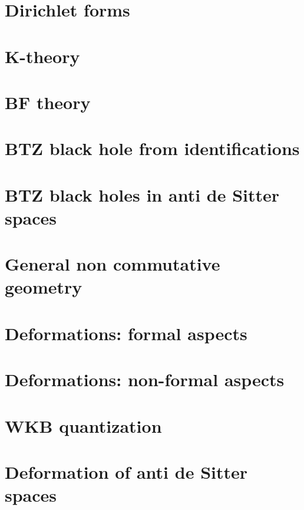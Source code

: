 \documentclass[a4paper,twoside,11pt]{book}
\begin{document}
\chapter{Dirichlet forms}


\chapter{K-theory}


\chapter{BF theory}


\chapter{BTZ black hole from identifications}




\chapter{BTZ black holes in anti de Sitter spaces}                  \label{ChapBHinAdS}









\chapter{General non commutative geometry}




\chapter{Deformations: formal aspects}          \label{ChapDefo}


\chapter{Deformations: non-formal aspects}




\chapter{WKB quantization}


\chapter{Deformation of anti de Sitter spaces}   \label{ChDefoBH}

\end{document}
